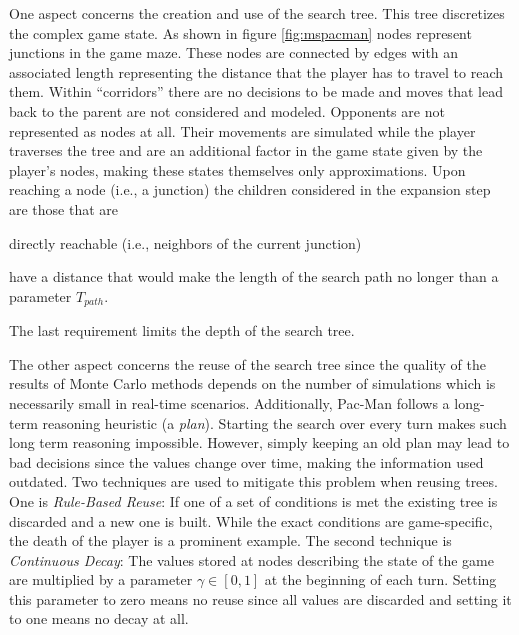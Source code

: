 One aspect concerns the creation and use of the search tree. This tree discretizes the complex game state. As shown in figure \ref{fig:mspacman} nodes represent junctions in the game maze. These nodes are connected by edges with an associated length representing the distance that the player has to travel to reach them. Within \enquote{corridors} there are no decisions to be made and moves that lead back to the parent are not considered and modeled. Opponents are not represented as nodes at all. Their movements are simulated while the player traverses the tree and are an additional factor in the game state given by the player's nodes, making these states themselves only approximations. Upon reaching a node (i.e., a junction) the children considered in the expansion step are those that are \begin{enumerate*}[label=\roman*)]
    \item directly reachable (i.e., neighbors of the current junction)
    \item have a distance that would make the length of the search path no longer than a parameter $T_{path}$.
\end{enumerate*} The last requirement limits the depth of the search tree.

The other aspect concerns the reuse of the search tree since the quality of the results of Monte Carlo methods depends on the number of simulations which is necessarily small in real-time scenarios. Additionally, Pac-Man follows a long-term reasoning heuristic (a \textit{plan}). Starting the search over every turn makes such long term reasoning impossible. However, simply keeping an old plan may lead to bad decisions since the values change over time, making the information used outdated. Two techniques are used to mitigate this problem when reusing trees. One is \textit{Rule-Based Reuse}: If one of a set of conditions is met the existing tree is discarded and a new one is built. While the exact conditions are game-specific, the death of the player is a prominent example. The second technique is \textit{Continuous Decay}: The values stored at nodes describing the state of the game are multiplied by a parameter $\gamma \in [0,1]$ at the beginning of each turn. Setting this parameter to zero means no reuse since all values are discarded and setting it to one means no decay at all.


